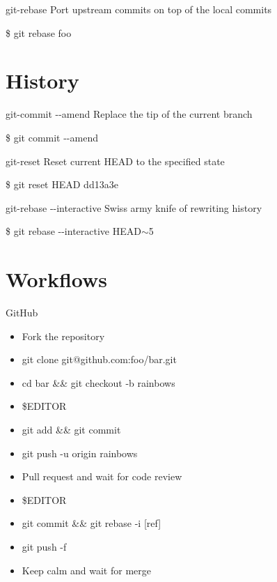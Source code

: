 \documentclass{beamer}
\begin{document}
\begin{frame}{git-rebase}
  Port upstream commits on top of the local commits
  \begin{Example}
    \$ git rebase foo
  \end{Example}
\end{frame}

\section{History}

\begin{frame}{git-commit -{}-amend}
  Replace the tip of the current branch
  \begin{Example}
    \$ git commit -{}-amend
  \end{Example}
\end{frame}

\begin{frame}{git-reset}
  Reset current HEAD to the specified state
  \begin{Example}
    \$ git reset HEAD dd13a3e
  \end{Example}
\end{frame}

\begin{frame}{git-rebase -{}-interactive}
  Swiss army knife of rewriting history
  \begin{Example}
    \$ git rebase -{}-interactive HEAD$\sim$5
  \end{Example}
\end{frame}

\section{Workflows}

\begin{frame}{GitHub}
  \begin{itemize}
  \item Fork the repository
  \item git clone git@github.com:foo/bar.git
  \item cd bar \&\& git checkout -b rainbows
  \item \$EDITOR
  \item git add \&\& git commit
  \item git push -u origin rainbows
  \item Pull request and wait for code review
  \item \$EDITOR
  \item git commit \&\& git rebase -i [ref]
  \item git push -f
  \item Keep calm and wait for merge
  \end{itemize}
\end{frame}
\end{document}
